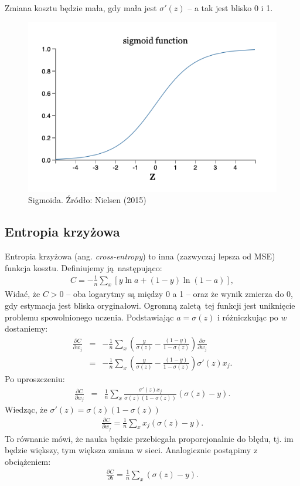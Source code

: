 \documentclass[10pt, oneside]{article}
\theoremstyle{remark}
\begin{document}
Zmiana kosztu będzie mała, gdy mała jest $\sigma'(z)$ -- a tak jest blisko 0 i 1.
\begin{figure}[!htpb]
	\centering
	\includegraphics[width=.5\linewidth]{figures/sigmoid2}
	\caption{Sigmoida. Źródło: Nielsen (2015)}
\end{figure}



\subsection{Entropia krzyżowa}
Entropia krzyżowa (ang. \emph{cross-entropy}) to inna (zazwyczaj lepsza od MSE) funkcja kosztu.
Definiujemy ją następująco:
\begin{eqnarray} 
  C = -\frac{1}{n} \sum_x \left[y \ln a + (1-y ) \ln (1-a) \right],
\end{eqnarray}
Widać, że $C > 0$ -- oba logarytmy są między 0 a 1 -- oraz że wynik zmierza do 0, gdy estymacja jest bliska oryginałowi.
Ogromną zaletą tej funkcji jest uniknięcie problemu spowolnionego uczenia.
Podstawiając $a = \sigma(z)$ i różniczkując po $w$ dostaniemy:
\begin{eqnarray}
  \frac{\partial C}{\partial w_j} & = & -\frac{1}{n} \sum_x \left(
    \frac{y }{\sigma(z)} -\frac{(1-y)}{1-\sigma(z)} \right)
  \frac{\partial \sigma}{\partial w_j} \\
 & = & -\frac{1}{n} \sum_x \left( 
    \frac{y}{\sigma(z)} 
    -\frac{(1-y)}{1-\sigma(z)} \right)\sigma'(z) x_j.
\end{eqnarray}
Po uproszczeniu:
\begin{eqnarray}
  \frac{\partial C}{\partial w_j} & = & \frac{1}{n}
  \sum_x \frac{\sigma'(z) x_j}{\sigma(z) (1-\sigma(z))}
  (\sigma(z)-y).
\end{eqnarray}
Wiedząc, że $\sigma'(z) = \sigma(z)(1-\sigma(z))$
\begin{eqnarray} 
  \frac{\partial C}{\partial w_j} =  \frac{1}{n} \sum_x x_j(\sigma(z)-y).
\end{eqnarray}
To równanie mówi, że nauka będzie przebiegała proporcjonalnie do błędu, tj. im będzie większy, tym większa zmiana w sieci.
Analogicznie postąpimy z obciążeniem:
\begin{eqnarray} 
  \frac{\partial C}{\partial b} = \frac{1}{n} \sum_x (\sigma(z)-y).
\end{eqnarray}
\end{document}
